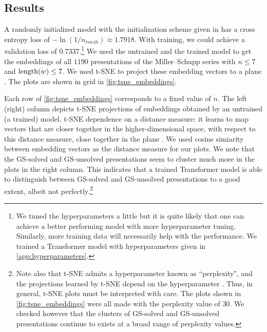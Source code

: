 \subsection{Results}\label{sec:transformer_results}

A randomly initialized model with the initialization scheme given in \cite{Radford2019LanguageMA} has a cross entropy loss of
$-\ln (1/n_{\text{vocab}}) \approx  1.7918$.
With training, we could achieve a validation loss of $0.7337$.\footnote{
We tuned the hyperparameters a little but it is quite likely that one can achieve a better performing model with more hyperparameter tuning.
Similarly, more training data will necessarily help with the performance.
We trained a Transformer model with hyperparameters given in  \autoref{app:hyperparameters}.}
We used the untrained and the trained model to get the embeddings of all $1190$ presentations of the Miller--Schupp series with $n \leq 7$ and $\operatorname{length}(w) \leq 7$.
We used t-SNE to project these embedding vectors to a plane \cite{JMLR:v9:vandermaaten08a}.
The plots are shown in grid in \autoref{fig:tsne_embeddings}.

Each row of \autoref{fig:tsne_embeddings} corresponds to a fixed value of $n$.
The left (right) column depicts t-SNE projections of embeddings obtained by an untrained (a trained) model.
t-SNE dependence on a distance measure: it learns to map vectors that are closer together in the higher-dimensional space, with respect to this distance measure, close together in the plane \cite{JMLR:v9:vandermaaten08a}.
We used cosine simiarity between embedding vectors as the distance measure for our plots.
We note that the GS-solved and GS-unsolved presentations seem to cluster much more in the plots in the right column.
This indicates that a trained Transformer model is able to distinguish between GS-solved and GS-unsolved presentations to a good extent, albeit not perfectly.\footnote{
Note also that t-SNE admits a hyperparameter known as ``perplexity", and the projections learned by t-SNE depend on the hyperparameter \cite{wattenberg2016how}.
Thus, in general, t-SNE plots must be interpreted with care.
The plots shown in \autoref{fig:tsne_embeddings} were all made with the perplexity value of $30$.
We checked however that the clusters of GS-solved and GS-unsolved presentations continue to exists at a broad range of perplexity values.}

